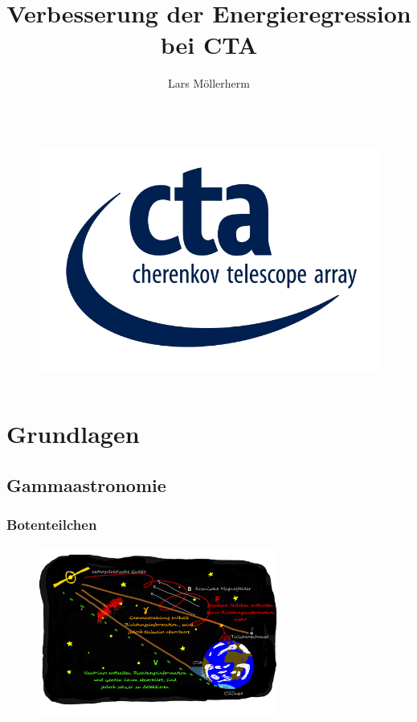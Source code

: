 \documentclass[aspectratio=1610, professionalfonts, 9pt]{beamer}
\title{Verbesserung der Energieregression bei CTA}
\author[L.~Möllerherm]{Lars Möllerherm}
\institute[Experimentelle Physik Vb]{Experimentelle Physik Vb \\  Fakultät Physik}
\begin{document}
  \begin{frame}
    \titlepage
  \end{frame}

  \begin{frame}
    \begin{columns}
      \tableofcontents
      \begin{figure}
        \includegraphics{pictures/CTA_logo.jpg}
        \caption{}
        \label{}
      \end{figure}
    \end{columns}
  \end{frame}

  \section{Grundlagen}
  \subsection{Gammaastronomie}
  \begin{frame}
    \frametitle{Botenteilchen}
      \begin{figure}
        \includegraphics[width=0.7\textwidth]{pictures/Folie5.pdf}
        \caption{}
        \label{abb:folie5}
      \end{figure}
  \end{frame}
\end{document}
